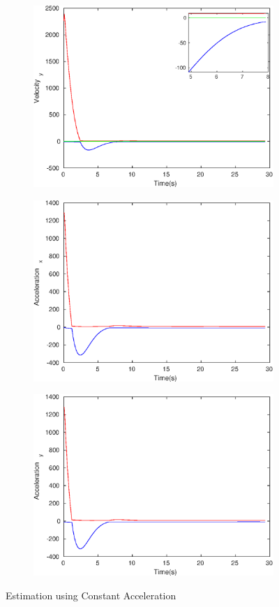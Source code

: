 \begin{figure}[h]
\begin{subfigure}{.5\linewidth}
\end{subfigure}
\begin{subfigure}{.5\linewidth}
\centering
\includegraphics[width=.9\linewidth]{figures/Prad/s3capradVelocity_y}
\end{subfigure}
\begin{subfigure}{.5\linewidth}
\centering
\includegraphics[width=.9\linewidth]{figures/Prad/s3capradAcceleration_x}
\end{subfigure}
\begin{subfigure}{.5\linewidth}
\centering
\includegraphics[width=.9\linewidth]{figures/Prad/s3capradAcceleration_y}
\end{subfigure}
\caption{Estimation using Constant Acceleration}
\end{figure}
